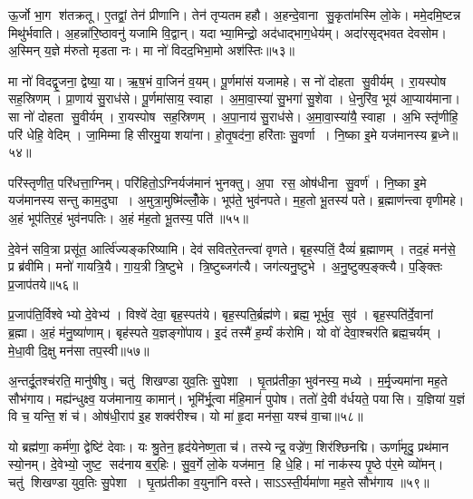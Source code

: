ऊ॒र्जो भा॒ग श॑तक्रतू।
ए॒तद्वां॒ तेन॑ प्रीणानि।
तेन॑ तृप्यतमहहौ।
अ॒हन्दे॒वाना सु॒कृता॑मस्मि लो॒के।
ममे॒दमि॒ष्टन्न मिथु॑र्भवाति।
अ॒हन्ना॑रि॒ष्ठावनु॑ यजामि वि॒द्वान्।
यदाभ्या॒मिन्द्रो॒ अद॑धाद्भाग॒धेय॑म्।
अदा॑रसृद्भवत देवसोम।
अ॒स्मिन् य॒ज्ञे म॑रुतो मृडता नः।
मा नो॑ विदद॒भिभा॒मो अश॑स्तिः॥५३॥

मा नो॑ विदद्वृ॒जना॒ द्वेष्या॒ या।
ऋ॒ष॒भं वा॒जिनं॑ व॒यम्।
पू॒र्णमा॑सं यजामहे।
स नो॑ दोहता सु॒वीर्यम्।
रा॒यस्पोष सह॒स्रिणम्।
प्रा॒णाय॑ सु॒राध॑से।
पू॒र्णमा॑साय॒ स्वाहा।
अ॒मा॒वा॒स्या॑ सु॒भगा॑ सु॒शेवा।
धे॒नुरि॑व॒ भूय॑ आ॒प्याय॑माना।
सा नो॑ दोहता सु॒वीर्यम्।
रा॒यस्पोष सह॒स्रिणम्।
अ॒पा॒नाय॑ सु॒राध॑से।
अ॒मा॒वा॒स्या॑यै॒ स्वाहा।
अ॒भि स्तृ॑णीहि॒ परि॑ धेहि॒ वेदिम्।
जा॒मिम्मा हिसीरमु॒या शया॑ना।
हो॒तृ॒षद॑ना॒ हरि॑ताः सु॒वर्णा।
नि॒ष्का इ॒मे यज॑मानस्य ब्र॒ध्ने॥५४॥

परि॑स्तृणीत॒ परि॑धत्ता॒ग्निम्।
परि॑हितो॒ऽग्निर्यज॑मानं भुनक्तु।
अ॒पा रस॒ ओष॑धीना सु॒वर्ण॑।
नि॒ष्का इ॒मे यज॑मानस्य सन्तु काम॒दुघा।
अ॒मुत्रा॒मुष्मि॑ल्लोँ॒के।
भूप॑ते॒ भुव॑नपते।
म॒ह॒तो भू॒तस्य॑ पते।
ब्र॒ह्माण॑न्त्वा वृणीमहे।
अ॒हं भूप॑तिर॒हं भुव॑नपतिः।
अ॒हं म॑ह॒तो भू॒तस्य॒ पति॑॥५५॥

दे॒वेन॑ सवि॒त्रा प्रसू॑त॒ आर्त्वि॑ज्यङ्करिष्यामि।
देव॑ सवितरे॒तन्त्वा॑ वृणते।
बृह॒स्पतिं॒ दैव्यं॑ ब्र॒ह्माणम्।
तद॒हं मन॑से॒ प्र ब्र॑वीमि।
मनो॑ गायत्रि॒यै।
गा॒य॒त्री त्रि॒ष्टुभे।
त्रि॒ष्टुब्जग॑त्यै।
जग॑त्यनु॒ष्टुभे।
अ॒नु॒ष्टुक्प॒ङ्क्त्यै।
प॒ङ्क्तिः प्र॒जाप॑तये॥५६॥

प्र॒जाप॑ति॒र्विश्वेभ्यो दे॒वेभ्य॑।
विश्वे॑ देवा॒ बृह॒स्पत॑ये।
बृह॒स्पति॒र्ब्रह्म॑णे।
ब्रह्म॒ भूर्भुव॒ सुव॑।
बृह॒स्पति॑र्दे॒वानां ब्र॒ह्मा।
अ॒हं म॑नु॒ष्या॑णाम्।
बृह॑स्पते य॒ज्ञङ्गो॑पाय।
इ॒दं तस्मै॑ ह॒र्म्यं क॑रोमि।
यो वो॑ देवा॒श्चर॑ति ब्रह्म॒चर्यम्।
मे॒धा॒वी दि॒क्षु मन॑सा तप॒स्वी॥५७॥

अ॒न्तर्दू॒तश्च॑रति॒ मानु॑षीषु।
चतु॑ शिखण्डा युव॒तिः सु॒पेशा।
घृ॒तप्र॑तीका॒ भुव॑नस्य॒ मध्ये।
म॒र्मृ॒ज्यमा॑ना मह॒ते सौभ॑गाय।
मह्य॑न्धुक्ष्व॒ यज॑मानाय॒ कामान्॑।
भूमि॑र्भू॒त्वा म॑हि॒मानं॑ पुपोष।
ततो॑ दे॒वी व॑र्धयते॒ पयासि।
य॒ज्ञिया॑ य॒ज्ञं वि च॒ यन्ति॒ शं च॑।
ओष॑धी॒राप॑ इ॒ह शक्व॑रीश्च।
यो मा॑ हृ॒दा मन॑सा॒ यश्च॑ वा॒चा॥५८॥

यो ब्रह्म॑णा॒ कर्म॑णा॒ द्वेष्टि॑ देवाः।
यः श्रु॒तेन॒ हृद॑येनेष्ण॒ता च॑।
तस्येन्द्र॒ वज्रे॑ण॒ शिर॑श्छिनद्मि।
ऊर्णा॑मृदु॒ प्रथ॑मान स्यो॒नम्।
दे॒वेभ्यो॒ जुष्ट॒ सद॑नाय ब॒र्॒हिः।
सु॒व॒र्गे लो॒के यज॑मान॒ हि धे॒हि।
मां नाक॑स्य पृ॒ष्ठे प॑र॒मे व्यो॑मन्।
चतु॑ शिखण्डा युव॒तिः सु॒पेशा।
घृ॒तप्र॑तीका व॒युना॑नि वस्ते।
साऽऽस्ती॒र्यमा॑णा मह॒ते सौभ॑गाय ॥५९॥

